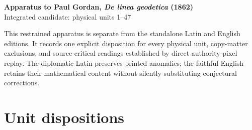 \documentclass[10pt]{article}
\begin{document}
\begin{center}
{\Large\bfseries Apparatus to Paul Gordan, \emph{De linea geodetica} (1862)}\\[0.45em]
{\large Integrated candidate: physical units 1--47}
\end{center}

This restrained apparatus is separate from the standalone Latin and English editions. It records one explicit disposition for every physical unit, copy-matter exclusions, and source-critical readings established by direct authority-pixel replay. The diplomatic Latin preserves printed anomalies; the faithful English retains their mathematical content without silently substituting conjectural corrections.

\section*{Unit dispositions}
\small

\normalsize
\end{document}
